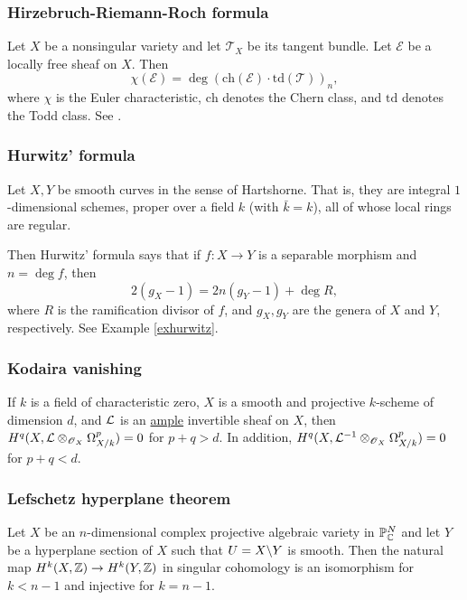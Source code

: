 \documentclass[11pt, english]{article}
\begin{document}
\subsubsection{Hirzebruch-Riemann-Roch formula}
\label{hirzebruchriemannroch}

Let $X$ be a nonsingular variety and let $\mathscr T_X$ be its tangent bundle. Let $\mathscr E$ be a locally free sheaf on $X$. Then
\[
\chi(\mathscr E) = \deg {\left( \mathrm{ch}(\mathscr E) \cdot \mathrm{td}(\mathscr T) \right)}_{n},
\]
where $\chi$ is the Euler characteristic, $\mathrm{ch}$ denotes the Chern class, and $\mathrm{td}$ denotes the Todd class. See \cite[Appendix A]{hartshorne}.

\subsubsection{Hurwitz' formula}
\label{hurwitzformula}

Let $X,Y$ be smooth curves in the sense of Hartshorne. That is, they are integral $1$-dimensional schemes, proper over a field $k$ (with $\bar k = k$), all of whose local rings are regular.

Then Hurwitz' formula says that if $f:X \to Y$ is a separable morphism and $n= \deg f$, then
\[
2(g_X-1) = 2n(g_Y-1) + \deg R,
\]
where $R$ is the ramification divisor of $f$, and $g_X,g_Y$ are the genera of $X$ and $Y$, respectively. See Example \ref{exhurwitz}. 

\subsubsection{Kodaira vanishing}
\label{kodairavanishing}
If $k$ is a field of characteristic zero, $X$ is a smooth and projective $k$-scheme of dimension $d$, and $\mathcal{L}$ is an \hyperref[amplelinebundle]{ample} invertible sheaf on $X$, then ${H^q(X,{\mathcal{L} \otimes_{\operatorname{\mathscr{O}}_X} \Omega^p_{X/k}})=0}$ for $p+q > d$. In addition, $H^q(X,\mathcal{L}^{-1} \otimes_{\operatorname{\mathscr{O}}_X} \Omega_{X/k}^p)=0$ for $p+q < d$. 

\subsubsection{Lefschetz hyperplane theorem}
\label{lefschetz} 
Let $X$ be an $n$-dimensional complex projective algebraic variety in $\mathbb{P}_{\mathbb{C}}^N$ and let $Y$ be a hyperplane section of $X$ such that $U=X \backslash Y$ is smooth. Then the natural map $H^k(X,\mathbb{Z}) \to H^k(Y,\mathbb{Z})$ in singular cohomology is an isomorphism for $k<n-1$ and injective for $k=n-1$.
\end{document}

